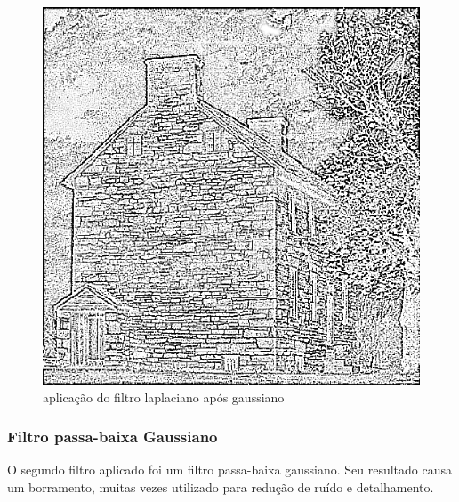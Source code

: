 \documentclass{article}
\begin{document}
\begin{figure}[h!]
    \includegraphics[width=\linewidth]{results/exercicio1agaussiano.png}
    \caption{aplicação do filtro laplaciano após gaussiano}
    \label{fig:exercicio1agauss}
\end{figure}

\subsubsection{Filtro passa-baixa Gaussiano}

O segundo filtro aplicado foi um filtro passa-baixa gaussiano. Seu resultado causa um borramento, muitas vezes utilizado para redução de ruído e detalhamento.
\end{document}
